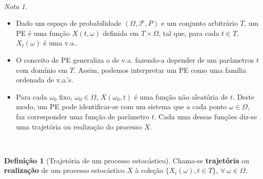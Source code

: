 \documentclass[
  11pt,
  a4paper,
]{book}
\theoremstyle{definition}
\newtheorem{definition}{Definição}[chapter]
\theoremstyle{definition}
\theoremstyle{definition}
\theoremstyle{definition}
\theoremstyle{remark}
\newtheorem*{remark}{Nota }
\begin{document}
\(\,\)

\begin{remark}
\leavevmode

\begin{itemize}
\item
  Dado um espaço de probabilidade \((\Omega, \mathcal{F}, P)\) e um conjunto arbitrário \(T\),
  um PE é uma função \(X(t,\omega)\) definida em \(T \times \Omega\), tal que, para cada
  \(t \in T\), \(X_t(\omega)\) é uma v.a..
\item
  O conceito de PE generaliza o de v.a. fazendo-a depender de um parâmetros \(t\) com
  domínio em \(T\). Assim, podemos interpretar um PE como uma família ordenada de v.a.'s.
\item
  Para cada \(\omega_0\) fixo, \(\omega_0 \in \Omega\), \(X(\omega_0,t)\) é uma função não
  aleatória de \(t\). Deste modo, um PE pode identificar-se com um sistema que a cada ponto
  \(\omega \in \Omega\), faz corresponder uma função de parâmetro \(t\). Cada uma dessas
  funções diz-se uma trajetória ou realização do processo \(X\).
\end{itemize}

\end{remark}

\(\,\)

\begin{definition}[Trajetória de um processo estocástico]
Chama-se \textbf{trajetória} ou \textbf{realização} de um processo estocástico \(X\) à coleção
\(\{X_t(\omega), t \in T\}\), \(\forall ~ \omega \in \Omega\).
\end{definition}

\(\,\)
\end{document}
